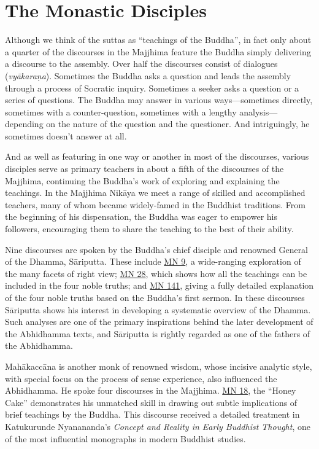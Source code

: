 \documentclass[12pt,openany]{book}%
\begin{document}
\section*{The Monastic Disciples}

Although we think of the suttas as “teachings of the Buddha”, in fact only about a quarter of the discourses in the Majjhima feature the Buddha simply delivering a discourse to the assembly. Over half the discourses consist of dialogues (\textit{\textsanskrit{vyākaraṇa}}). Sometimes the Buddha asks a question and leads the assembly through a process of Socratic inquiry. Sometimes a seeker asks a question or a series of questions. The Buddha may answer in various ways—sometimes directly, sometimes with a counter-question, sometimes with a lengthy analysis—depending on the nature of the question and the questioner. And intriguingly, he sometimes doesn’t answer at all.

And as well as featuring in one way or another in most of the discourses, various disciples serve as primary teachers in about a fifth of the discourses of the Majjhima, continuing the Buddha’s work of exploring and explaining the teachings. In the Majjhima \textsanskrit{Nikāya} we meet a range of skilled and accomplished teachers, many of whom became widely-famed in the Buddhist traditions. From the beginning of his dispensation, the Buddha was eager to empower his followers, encouraging them to share the teaching to the best of their ability.

Nine discourses are spoken by the Buddha’s chief disciple and renowned General of the Dhamma, \textsanskrit{Sāriputta}. These include \href{https://suttacentral.net/mn9}{MN 9}, a wide-ranging exploration of the many facets of right view; \href{https://suttacentral.net/mn28}{MN 28}, which shows how all the teachings can be included in the four noble truths; and \href{https://suttacentral.net/mn141}{MN 141}, giving a fully detailed explanation of the four noble truths based on the Buddha’s first sermon. In these discourses \textsanskrit{Sāriputta} shows his interest in developing a systematic overview of the Dhamma. Such analyses are one of the primary inspirations behind the later development of the Abhidhamma texts, and \textsanskrit{Sāriputta} is rightly regarded as one of the fathers of the Abhidhamma.

\textsanskrit{Mahākaccāna} is another monk of renowned wisdom, whose incisive analytic style, with special focus on the process of sense experience, also influenced the Abhidhamma. He spoke four discourses in the Majjhima. \href{https://suttacentral.net/mn18}{MN 18}, the “Honey Cake” demonstrates his unmatched skill in drawing out subtle implications of brief teachings by the Buddha. This discourse received a detailed treatment in Katukurunde Nyanananda’s \textit{Concept and Reality in Early Buddhist Thought}, one of the most influential monographs in modern Buddhist studies.
\end{document}
